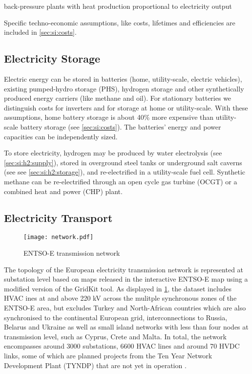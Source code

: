 back-pressure plants with heat production proportional to electricity output

Specific techno-economic assumptions, like costs, lifetimes and efficiencies are
included in \cref{sec:si:costs}.

\subsection{Electricity Storage}
\label{sec:si:electricity:storage}

Electric energy can be stored in batteries (home, utility-scale, electric
vehicles), existing pumped-hydro storage (PHS), hydrogen storage and other
synthetically produced energy carriers (like methane and oil). For stationary
batteries we distinguish costs for inverters and for storage at home or
utility-scale. With these assumptions, home battery storage is about 40\% more
expensive than utility-scale battery storage (see \cref{sec:si:costs}). The
batteries' energy and power capacities can be independently sized.

To store electricity, hydrogen may be produced by water electrolysis (see \cref{sec:si:h2:supply}),
stored in overground steel tanks or underground salt caverns (see see \cref{sec:si:h2:storage}), and
re-electrified in a utility-scale fuel cell. Synthetic methane can be
re-electrified through an open cycle gas turbine (OCGT) or a combined heat and
power (CHP) plant.

\subsection{Electricity Transport}
\label{sec:si:electricity:transport}

\begin{figure}
    \texttt{[image: network.pdf]}
    \label{fig:base-network}
    \caption{ENTSO-E transmission network}
\end{figure}


The topology of the European electricity transmission network is represented at
substation level based on maps released in the interactive ENTSO-E map \citeS{}
using a modified version of the GridKit \citeS{} tool. As displayed in
\cref{fig:base-network}, the dataset includes HVAC ines at and above 220 kV
across the mulitple synchronous zones of the ENTSO-E area, but excludes Turkey
and North-African countries which are also synchronised to the continental
European grid, interconnections to Russia, Belarus and Ukraine as well as small
island networks with less than four nodes at transmission level, such as Cyprus,
Crete and Malta. In total, the network encompasses around 3000 substations, 6600
HVAC lines and around 70 HVDC links, some of which are planned projects from the
Ten Year Network Development Plant (TYNDP) that are not yet in operation
\citeS{}.

